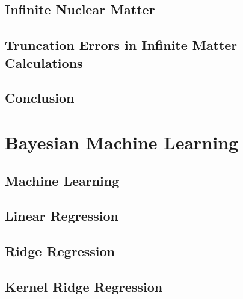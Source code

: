 \documentclass[12pt]{book}
\begin{document}
    \section{Infinite Nuclear Matter}
        


    \section{Truncation Errors in Infinite Matter Calculations}
            

    \section{Conclusion}
        

\chapter{Bayesian Machine Learning}
    \section{Machine Learning}
        

    \section{Linear Regression}
        

    \section{Ridge Regression}
        

    \section{Kernel Ridge Regression}
        
\end{document}
